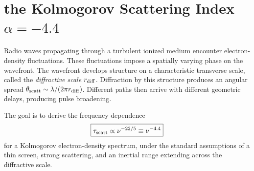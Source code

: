 
% 

\section{the Kolmogorov Scattering Index $\alpha=-4.4$}
Radio waves propagating through a turbulent ionized medium encounter electron-density fluctuations. These fluctuations impose a spatially varying phase on the wavefront. The wavefront develops structure on a characteristic transverse scale, called the \emph{diffractive scale} $r_{\rm diff}$. Diffraction by this structure produces an angular spread $\theta_{\rm scatt}\sim\lambda/(2\pi r_{\rm diff})$. Different paths then arrive with different geometric delays, producing pulse broadening.

The goal is to derive the frequency dependence
\begin{equation}
\boxed{\tau_{\rm scatt}\propto\nu^{-22/5}\equiv\nu^{-4.4}}
\end{equation}
for a Kolmogorov electron-density spectrum, under the standard assumptions of a thin screen, strong scattering, and an inertial range extending across the diffractive scale.

\begin{center}
\end{center}

